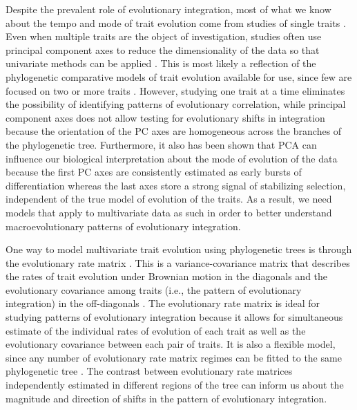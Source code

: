 Despite the prevalent role of evolutionary integration, most of what we know about the tempo and mode of trait evolution come from studies of single traits \citep[e.g.,][among others]{harmon_early_2010, hunt_simple_2015}. Even when multiple traits are the object of investigation, studies often use principal component axes \citep[or phylogenetic PCA;][]{revell_size-correction_2009} to reduce the dimensionality of the data so that univariate methods can be applied \citep[][see \citealt{uyeda_comparative_2015} for more examples]{harmon_early_2010, mahler_exceptional_2013, klingenberg_evolutionary_2013}. This is most likely a reflection of the phylogenetic comparative models of trait evolution available for use, since few are focused on two or more traits \citep[but see][]{revell_testing_2008, hohenlohe_mipod:_2008, revell_phylogenetic_2009, bartoszek_phylogenetic_2012, adams_comparing_2012, adams_quantifying_2014, Clavel_mvmorph}. However, studying one trait at a time eliminates the possibility of identifying patterns of evolutionary correlation, while principal component axes does not allow testing for evolutionary shifts in integration because the orientation of the PC axes are homogeneous across the branches of the phylogenetic tree. Furthermore, it also has been shown that PCA can influence our biological interpretation about the mode of evolution of the data \citep{uyeda_comparative_2015} because the first PC axes are consistently estimated as early bursts of differentiation whereas the last axes store a strong signal of stabilizing selection, independent of the true model of evolution of the traits. As a result, we need models that apply to multivariate data as such in order to better understand macroevolutionary patterns of evolutionary integration.

One way to model multivariate trait evolution using phylogenetic trees is through the evolutionary rate matrix \citep{hohenlohe_mipod:_2008, revell_testing_2008, revell_phylogenetic_2009, adams_assessing_2014}. This is a variance-covariance matrix that describes the rates of trait evolution under Brownian motion in the diagonals and the evolutionary covariance among traits (i.e., the pattern of evolutionary integration) in the off-diagonals \citep{huelsenbeck_detecting_2003, revell_testing_2008}. The evolutionary rate matrix is ideal for studying patterns of evolutionary integration because it allows for simultaneous estimate of the individual rates of evolution of each trait as well as the evolutionary covariance between each pair of traits. It is also a flexible model, since any number of evolutionary rate matrix regimes can be fitted to the same phylogenetic tree \citep{revell_phylogenetic_2009}. The contrast between evolutionary rate matrices independently estimated in different regions of the tree can inform us about the magnitude and direction of shifts in the pattern of evolutionary integration.

